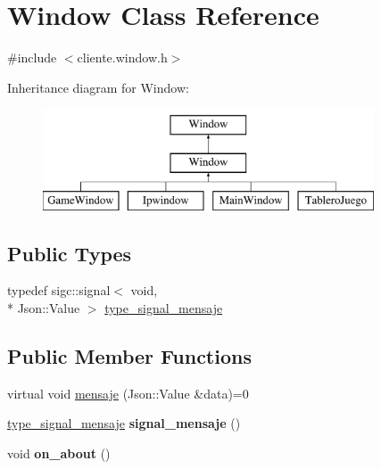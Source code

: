 \hypertarget{classWindow}{\section{Window Class Reference}
\label{classWindow}
}


{\ttfamily \#include $<$cliente.\-window.\-h$>$}

Inheritance diagram for Window\-:\begin{figure}[H]
\begin{center}
\leavevmode
\includegraphics[height=3.000000cm]{classWindow}
\end{center}
\end{figure}
\subsection*{Public Types}
\begin{DoxyCompactItemize}
\item 
typedef sigc\-::signal$<$ void, \\*
Json\-::\-Value $>$ \hyperlink{classWindow_aee13a32f2064bb223c52ed10f8e41cb7}{type\-\_\-signal\-\_\-mensaje}
\end{DoxyCompactItemize}
\subsection*{Public Member Functions}
\begin{DoxyCompactItemize}
\item 
virtual void \hyperlink{classWindow_a6034ea4f54b6647de07b19ff95fb22ae}{mensaje} (Json\-::\-Value \&data)=0
\item 
\hypertarget{classWindow_a6d58f947e191a7c43d2578af1bae0bc5}{\hyperlink{classWindow_aee13a32f2064bb223c52ed10f8e41cb7}{type\-\_\-signal\-\_\-mensaje} {\bfseries signal\-\_\-mensaje} ()}\label{classWindow_a6d58f947e191a7c43d2578af1bae0bc5}

\item 
\hypertarget{classWindow_aa675d86b2857aac2a9111f8e8f473312}{void {\bfseries on\-\_\-about} ()}\label{classWindow_aa675d86b2857aac2a9111f8e8f473312}

\end{DoxyCompactItemize}
